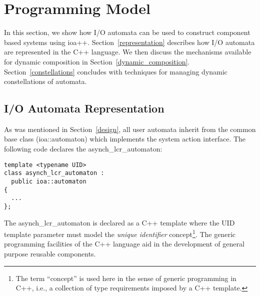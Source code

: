 \section{Programming Model\label{programming_model}}

In this section, we show how I/O automata can be used to construct component based systems using ioa++.
Section~\ref{representation} describes how I/O automata are represented in the C++ language.
We then discuss the mechanisms available for dynamic composition in Section~\ref{dynamic_composition}.
Section~\ref{constellations} concludes with techniques for managing dynamic constellations of automata.

\subsection{I/O Automata Representation\label{representation}}

As was mentioned in Section~\ref{design}, all user automata inherit from the common base class (ioa::automaton) which implements the system action interface.
\ifjournal
The following code declares the asynch\_lcr\_automaton:
\begin{lstlisting}
template <typename UID>
class asynch_lcr_automaton :
  public ioa::automaton
{
  ...
};
\end{lstlisting}
The asynch\_lcr\_automaton is declared as a C++ template where the UID template parameter must model the \emph{unique identifier} concept\footnote{The term ``concept'' is used here in the sense of generic programming in C++, i.e., a collection of type requirements imposed by a C++ template.}.
The generic programming facilities of the C++ language aid in the development of general purpose reusable components.

